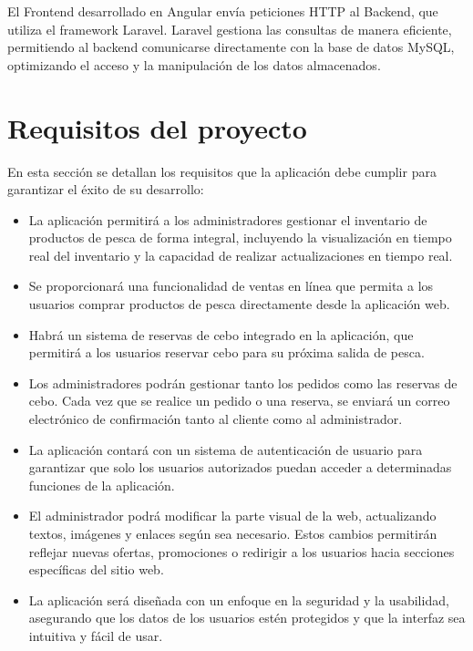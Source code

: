 El Frontend desarrollado en Angular envía peticiones HTTP al Backend, que utiliza el framework Laravel. Laravel gestiona las consultas de manera eficiente, permitiendo al backend comunicarse directamente con la base de datos MySQL, optimizando el acceso y la manipulación de los datos almacenados.

\section{Requisitos del proyecto}\label{sec:sec2.2}
En esta sección se detallan los requisitos que la aplicación debe cumplir para garantizar el éxito de su desarrollo:


\begin{itemize}
    \item La aplicación permitirá a los administradores gestionar el inventario de productos de pesca de forma integral, incluyendo la visualización en tiempo real del inventario y la capacidad de realizar actualizaciones en tiempo real.
    
    \item Se proporcionará una funcionalidad de ventas en línea que permita a los usuarios comprar productos de pesca directamente desde la aplicación web.
    
    \item Habrá un sistema de reservas de cebo integrado en la aplicación, que permitirá a los usuarios reservar cebo para su próxima salida de pesca.

    \item Los administradores podrán gestionar tanto los pedidos como las reservas de cebo. Cada vez que se realice un pedido o una reserva, se enviará un correo electrónico de confirmación tanto al cliente como al administrador.

    \item La aplicación contará con un sistema de autenticación de usuario para garantizar que solo los usuarios autorizados puedan acceder a determinadas funciones de la aplicación.

    \item El administrador podrá modificar la parte visual de la web, actualizando textos, imágenes y enlaces según sea necesario. Estos cambios permitirán reflejar nuevas ofertas, promociones o redirigir a los usuarios hacia secciones específicas del sitio web.

    \item La aplicación será diseñada con un enfoque en la seguridad y la usabilidad, asegurando que los datos de los usuarios estén protegidos y que la interfaz sea intuitiva y fácil de usar.
    
\end{itemize}